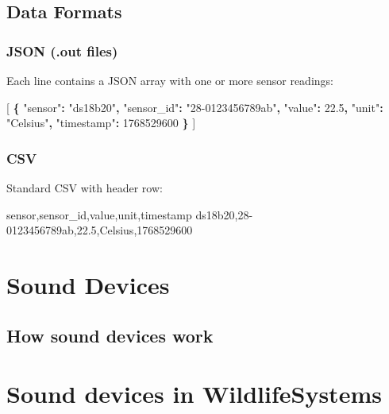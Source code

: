 \documentclass[
]{book}
\newenvironment{Shaded}{\begin{snugshade}}{\end{snugshade}}
\newcommand{\DataTypeTok}[1]{\textcolor[rgb]{0.13,0.29,0.53}{#1}}
\newcommand{\DecValTok}[1]{\textcolor[rgb]{0.00,0.00,0.81}{#1}}
\newcommand{\FloatTok}[1]{\textcolor[rgb]{0.00,0.00,0.81}{#1}}
\newcommand{\FunctionTok}[1]{\textcolor[rgb]{0.13,0.29,0.53}{\textbf{#1}}}
\newcommand{\NormalTok}[1]{#1}
\newcommand{\OtherTok}[1]{\textcolor[rgb]{0.56,0.35,0.01}{#1}}
\newcommand{\StringTok}[1]{\textcolor[rgb]{0.31,0.60,0.02}{#1}}
\begin{document}
\section{Data Formats}\label{data-formats}

\subsection{JSON (.out files)}\label{json-.out-files}

Each line contains a JSON array with one or more sensor readings:

\begin{Shaded}
\begin{Highlighting}[]
\OtherTok{[} \FunctionTok{\{} \DataTypeTok{"sensor"}\FunctionTok{:} \StringTok{"ds18b20"}\FunctionTok{,} \DataTypeTok{"sensor\_id"}\FunctionTok{:} \StringTok{"28{-}0123456789ab"}\FunctionTok{,} \DataTypeTok{"value"}\FunctionTok{:} \FloatTok{22.5}\FunctionTok{,} \DataTypeTok{"unit"}\FunctionTok{:} \StringTok{"Celsius"}\FunctionTok{,} \DataTypeTok{"timestamp"}\FunctionTok{:} \DecValTok{1768529600} \FunctionTok{\}} \OtherTok{]}
\end{Highlighting}
\end{Shaded}

\subsection{CSV}\label{csv}

Standard CSV with header row:

\begin{Shaded}
\begin{Highlighting}[]
\NormalTok{sensor,sensor\_id,value,unit,timestamp}
\NormalTok{ds18b20,28{-}0123456789ab,22.5,Celsius,1768529600}
\end{Highlighting}
\end{Shaded}

\chapter{Sound Devices}\label{sound-devices}

\section{How sound devices work}\label{how-sound-devices-work}

\chapter{Sound devices in WildlifeSystems}\label{sound-devices-in-wildlifesystems}
\end{document}
